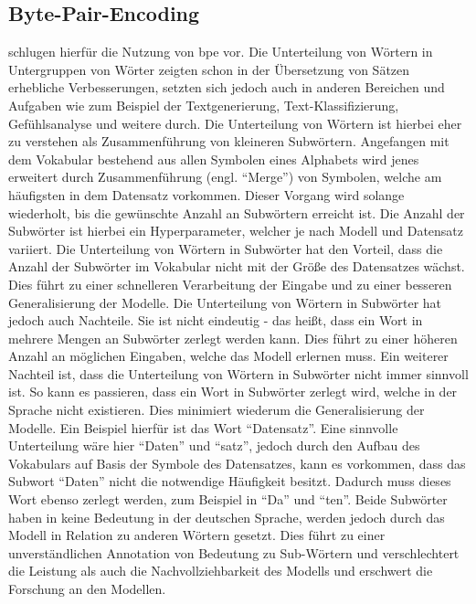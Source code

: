\subsection{Byte-Pair-Encoding}\label{subsec:bpe}
\citet{bpe} schlugen hierfür die Nutzung von \ac{bpe} vor.
Die Unterteilung von Wörtern in Untergruppen von Wörter zeigten schon in der Übersetzung von Sätzen erhebliche Verbesserungen, setzten sich jedoch auch in anderen Bereichen und Aufgaben wie zum Beispiel der Textgenerierung, Text-Klassifizierung, Gefühlsanalyse und weitere durch.
Die Unterteilung von Wörtern ist hierbei eher zu verstehen als Zusammenführung von kleineren Subwörtern.
Angefangen mit dem Vokabular bestehend aus allen Symbolen eines Alphabets wird jenes erweitert durch Zusammenführung (engl. \enquote{Merge}) von Symbolen, welche am häufigsten in dem Datensatz vorkommen.
Dieser Vorgang wird solange wiederholt, bis die gewünschte Anzahl an Subwörtern erreicht ist.
Die Anzahl der Subwörter ist hierbei ein Hyperparameter, welcher je nach Modell und Datensatz variiert.
Die Unterteilung von Wörtern in Subwörter hat den Vorteil, dass die Anzahl der Subwörter im Vokabular nicht mit der Größe des Datensatzes wächst.
Dies führt zu einer schnelleren Verarbeitung der Eingabe und zu einer besseren Generalisierung der Modelle.
Die Unterteilung von Wörtern in Subwörter hat jedoch auch Nachteile. Sie ist nicht eindeutig - das heißt, dass ein Wort in mehrere Mengen an Subwörter zerlegt werden kann.
Dies führt zu einer höheren Anzahl an möglichen Eingaben, welche das Modell erlernen muss.
Ein weiterer Nachteil ist, dass die Unterteilung von Wörtern in Subwörter nicht immer sinnvoll ist.
So kann es passieren, dass ein Wort in Subwörter zerlegt wird, welche in der Sprache nicht existieren.
Dies minimiert wiederum die Generalisierung der Modelle.
Ein Beispiel hierfür ist das Wort \enquote{Datensatz}.
Eine sinnvolle Unterteilung wäre hier \enquote{Daten} und \enquote{satz}, jedoch durch den Aufbau des Vokabulars auf Basis der Symbole des Datensatzes, kann es vorkommen, dass das Subwort \enquote{Daten} nicht die notwendige Häufigkeit besitzt.
Dadurch muss dieses Wort ebenso zerlegt werden, zum Beispiel in \enquote{Da} und \enquote{ten}.
Beide Subwörter haben in keine Bedeutung in der deutschen Sprache, werden jedoch durch das Modell in Relation zu anderen Wörtern gesetzt.
Dies führt zu einer unverständlichen Annotation von Bedeutung zu Sub-Wörtern und verschlechtert die Leistung als auch die Nachvollziehbarkeit des Modells und erschwert die Forschung an den Modellen. 

